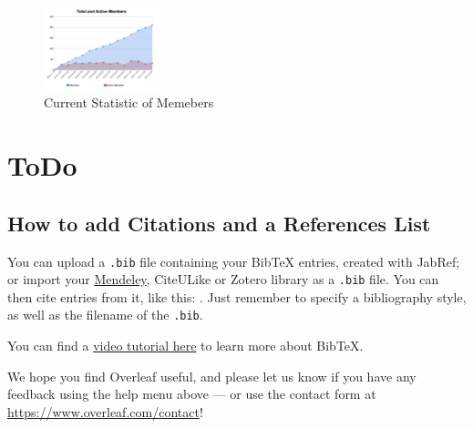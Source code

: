 \documentclass[a4paper]{article}
\begin{document}
\begin{figure}
\centering
\includegraphics[width=0.3\textwidth]{graph_fcc.jpeg}
\caption{\label{fig:graph_fcc}Current Statistic of Memebers}
\end{figure}

\section{ToDo}


\subsection{How to add Citations and a References List}

You can upload a \verb|.bib| file containing your BibTeX entries, created with JabRef; or import your \href{https://www.overleaf.com/blog/184}{Mendeley}, CiteULike or Zotero library as a \verb|.bib| file. You can then cite entries from it, like this: \cite{greenwade93}. Just remember to specify a bibliography style, as well as the filename of the \verb|.bib|.

You can find a \href{https://www.overleaf.com/help/97-how-to-include-a-bibliography-using-bibtex}{video tutorial here} to learn more about BibTeX.

We hope you find Overleaf useful, and please let us know if you have any feedback using the help menu above --- or use the contact form at \url{https://www.overleaf.com/contact}!



\end{document}
